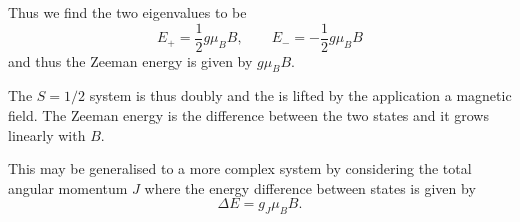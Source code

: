 Thus we find the two eigenvalues to be
$$E_+ =\frac{1}{2}g\mu_BB, \qquad E_-=-\frac{1}{2}g\mu_BB$$
and thus the Zeeman energy is given by $g\mu_B B$. 

The $S=1/2$ system is thus doubly  and the  is lifted by the application a magnetic field. The Zeeman energy is the difference between the two states and it grows linearly with $B$. 

This may be generalised to a more complex system by considering the total angular momentum $J$ where the energy difference between states is given by 
\begin{equation}
   \Delta E = g_J \mu_B B. 
    \label{eq:zeeman_energy}
\end{equation}





